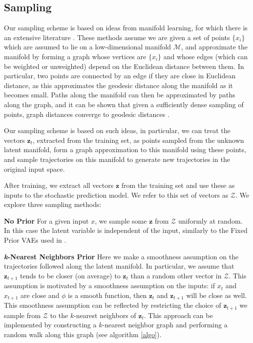 \documentclass{article}
\begin{document}
\subsection{Sampling}

Our sampling scheme is based on ideas from manifold learning, for which there is an extensive literature \citep{isomap, LLE, Belkin2003, TSNE}.
These methods assume we are given a set of points $\{x_i\}$ which are assumed to lie on a low-dimensional manifold $\mathcal{M}$, and approximate the manifold by forming a graph whose vertices are $\{x_i\}$ and whose edges (which can be weighted or unweighted) depend on the Euclidean distance between them. In particular, two points are connected by an edge if they are close in Euclidean distance, as this approximates the geodesic distance along the manifold as it becomes small.
Paths along the manifold can then be approximated by paths along the graph, and it can be shown that given a sufficiently dense sampling of points, graph distances converge to geodesic distances \citep{Bernstein2000}.

Our sampling scheme is based on such ideas, in particular, we can treat the vectors $\bm{z}_t$, extracted from the training set, as points sampled from the unknown latent manifold, form a graph approximation to this manifold using these points, and sample trajectories on this manifold to generate new trajectories in the original input space.

After training, we extract all vectors $\bm{z}$ from the training set and use these as inputs to the stochastic prediction model.
We refer to this set of vectors as $\mathcal{Z}$.
We explore three sampling methods:

\textbf{No Prior} \quad
For a given input $x$, we sample some $\bm{z}$ from $\mathcal{Z}$ uniformly at random. In this case the latent variable is independent of the input, similarly to the Fixed Prior VAEs used in \citep{Denton18}.

\textbf{\emph{k}-Nearest Neighbors Prior} \quad
Here we make a smoothness assumption on the trajectories followed along the latent manifold.
In particular, we assume that $\bm{z}_{t+1}$ tends to be closer (on average) to $\bm{z}_t$ than a random other vector in $\mathcal{Z}$.
This assumption is motivated by a smoothness assumption on the inputs: if $x_t$ and $x_{t+1}$ are close and $\phi$ is a smooth function, then $\bm{z}_t$ and $\bm{z}_{t+1}$ will be close as well.
This smoothness assumption can be reflected by restricting the choice of $\bm{z}_{t+1}$ we sample from $\mathcal{Z}$ to the $k$-nearest neighbors of $\bm{z}_t$.
This approach can be implemented by constructing a $k$-nearest neighbor graph and performing a random walk along this graph (see algorithm \ref{algo}).
\end{document}
